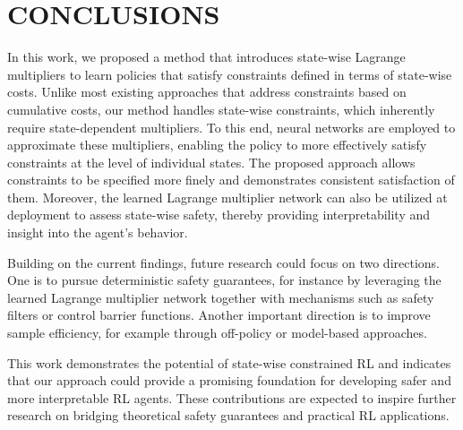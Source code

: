 \section{CONCLUSIONS}

In this work, we proposed a method that introduces state-wise Lagrange multipliers to learn policies that satisfy constraints defined in terms of state-wise costs.
Unlike most existing approaches that address constraints based on cumulative costs, our method handles state-wise constraints, which inherently require state-dependent multipliers.
To this end, neural networks are employed to approximate these multipliers, enabling the policy to more effectively satisfy constraints at the level of individual states.
The proposed approach allows constraints to be specified more finely and demonstrates consistent satisfaction of them.
Moreover, the learned Lagrange multiplier network can also be utilized at deployment to assess state-wise safety, thereby providing interpretability and insight into the agent’s behavior.

Building on the current findings, future research could focus on two directions.
One is to pursue deterministic safety guarantees, for instance by leveraging the learned Lagrange multiplier network together with mechanisms such as safety filters or control barrier functions.
Another important direction is to improve sample efficiency, for example through off-policy or model-based approaches.

This work demonstrates the potential of state-wise constrained RL and indicates that our approach could provide a promising foundation for developing safer and more interpretable RL agents.
These contributions are expected to inspire further research on bridging theoretical safety guarantees and practical RL applications.